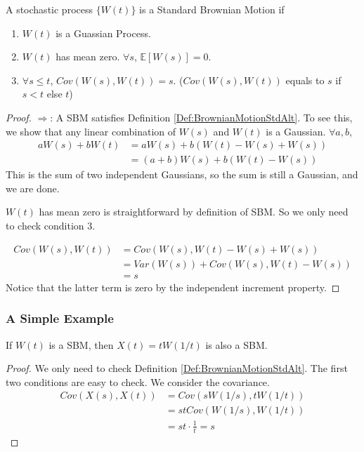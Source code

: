         \begin{definition}\label{Def:BrownianMotionStdAlt}
            A stochastic process $\{W(t)\}$ is a Standard Brownian Motion if
            \begin{enumerate}
                \item $W(t)$ is a Guassian Process.
                \item $W(t)$ has mean zero. $\forall s$, $\mathbb{E}[W(s)] = 0$.
                \item $\forall s \le t$, $Cov(W(s), W(t)) = s$. ($Cov(W(s), W(t))$ equals to $s$ if $s < t$ else $t$)
            \end{enumerate}
        \end{definition}
        \begin{proof}
            $\Rightarrow$: A SBM satisfies Definition \ref{Def:BrownianMotionStdAlt}. To see this, we show that any linear combination of $W(s)$ and $W(t)$ is a Gaussian. $\forall a,b$,
            \begin{align*}
                aW(s) + bW(t) &= aW(s) + b(W(t) - W(s) + W(s))\\
                &= (a+b)W(s) + b(W(t)-W(s))
            \end{align*}
            This is the sum of two independent Gaussians, so the sum is still a Gaussian, and we are done.

            $W(t)$ has mean zero is straightforward by definition of SBM. So we only need to check condition 3.

            \begin{align*}
                Cov(W(s), W(t)) &= Cov(W(s), W(t) - W(s) + W(s))\\
                &= Var(W(s)) + Cov(W(s), W(t) - W(s))\\
                &=s
            \end{align*}
            Notice that the latter term is zero by the independent increment property.
        \end{proof}

        \subsubsection{A Simple Example}
            If $W(t)$ is a SBM, then $X(t)=tW(1/t)$ is also a SBM.
            \begin{proof}
                We only need to check Definition \ref{Def:BrownianMotionStdAlt}. The first two conditions are easy to check. We consider the covariance.
                \begin{align*}
                    Cov(X(s), X(t)) &= Cov(sW(1/s),tW(1/t))\\
                    &= stCov(W(1/s), W(1/t))\\
                    &= st\cdot\frac{1}{t} = s
                \end{align*}
            \end{proof}

